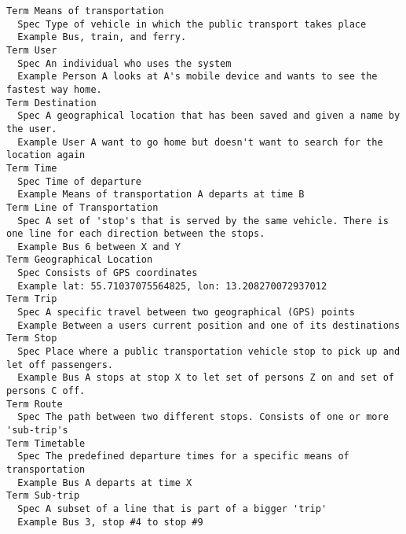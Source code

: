 

\begin{lstlisting}
Term Means of transportation
  Spec Type of vehicle in which the public transport takes place
  Example Bus, train, and ferry.
Term User
  Spec An individual who uses the system
  Example Person A looks at A's mobile device and wants to see the fastest way home.
Term Destination
  Spec A geographical location that has been saved and given a name by the user.
  Example User A want to go home but doesn't want to search for the location again
Term Time
  Spec Time of departure
  Example Means of transportation A departs at time B
Term Line of Transportation
  Spec A set of 'stop's that is served by the same vehicle. There is one line for each direction between the stops.
  Example Bus 6 between X and Y
Term Geographical Location
  Spec Consists of GPS coordinates
  Example lat: 55.71037075564825, lon: 13.208270072937012
Term Trip
  Spec A specific travel between two geographical (GPS) points
  Example Between a users current position and one of its destinations
Term Stop
  Spec Place where a public transportation vehicle stop to pick up and let off passengers.
  Example Bus A stops at stop X to let set of persons Z on and set of persons C off.
Term Route
  Spec The path between two different stops. Consists of one or more 'sub-trip's
Term Timetable
  Spec The predefined departure times for a specific means of transportation
  Example Bus A departs at time X
Term Sub-trip
  Spec A subset of a line that is part of a bigger 'trip'
  Example Bus 3, stop #4 to stop #9

\end{lstlisting}
